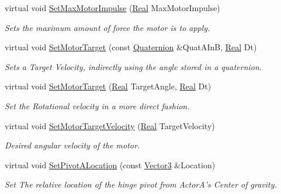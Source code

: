 \begin{DoxyCompactItemize}
virtual void \hyperlink{classMezzanine_1_1HingeConstraint_aa2f0a760f84f7682feb6d8564256e644}{SetMaxMotorImpulse} (\hyperlink{namespaceMezzanine_a726731b1a7df72bf3583e4a97282c6f6}{Real} MaxMotorImpulse)
\begin{DoxyCompactList}\small\item\em Sets the maximum amount of force the motor is to apply. \item\end{DoxyCompactList}\item 
virtual void \hyperlink{classMezzanine_1_1HingeConstraint_a7d195f18c2fbe6f458c4af94320c923c}{SetMotorTarget} (const \hyperlink{classMezzanine_1_1Quaternion}{Quaternion} \&QuatAInB, \hyperlink{namespaceMezzanine_a726731b1a7df72bf3583e4a97282c6f6}{Real} Dt)
\begin{DoxyCompactList}\small\item\em Sets a Target Velocity, indirectly using the angle stored in a quaternion. \item\end{DoxyCompactList}\item 
virtual void \hyperlink{classMezzanine_1_1HingeConstraint_ab6ec259478024f5fedc055563cf15ee6}{SetMotorTarget} (\hyperlink{namespaceMezzanine_a726731b1a7df72bf3583e4a97282c6f6}{Real} TargetAngle, \hyperlink{namespaceMezzanine_a726731b1a7df72bf3583e4a97282c6f6}{Real} Dt)
\begin{DoxyCompactList}\small\item\em Set the Rotational velocity in a more direct fashion. \item\end{DoxyCompactList}\item 
virtual void \hyperlink{classMezzanine_1_1HingeConstraint_a8aa2831ceaa742ced7f120f930409e9b}{SetMotorTargetVelocity} (\hyperlink{namespaceMezzanine_a726731b1a7df72bf3583e4a97282c6f6}{Real} TargetVelocity)
\begin{DoxyCompactList}\small\item\em Desired angular velocity of the motor. \item\end{DoxyCompactList}\item 
virtual void \hyperlink{classMezzanine_1_1HingeConstraint_a0990b3b85529df353aaa46f76951fd68}{SetPivotALocation} (const \hyperlink{classMezzanine_1_1Vector3}{Vector3} \&Location)
\begin{DoxyCompactList}\small\item\em Set The relative location of the hinge pivot from ActorA's Center of gravity. \item\end{DoxyCompactList}\item 

\end{DoxyCompactItemize}
